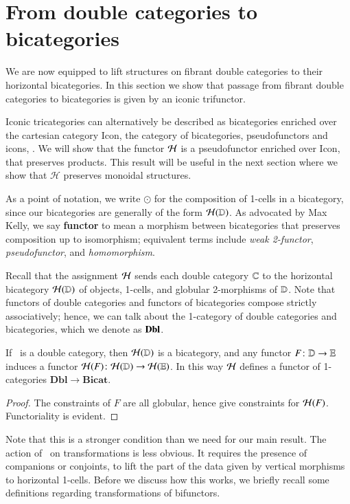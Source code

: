\documentclass{amsart}
\begin{document}
\section{From double categories to bicategories}
\label{sec:1x1-to-bicat}

We are now equipped to lift structures on fibrant double categories to
their horizontal bicategories.  In this section we show that passage
from fibrant double categories to bicategories is given by an iconic trifunctor.

Iconic tricategories can alternatively be described as bicategories enriched over the cartesian category Icon, the category of bicategories, pseudofunctors and icons, \cite{shulman:psalg}.
We will show that the functor $\mathcal{H}$ is a pseudofunctor enriched over Icon, that preserves products. This result will be useful in the next section where we show that $\mathcal{H}$ preserves monoidal structures.

As a point of notation, we write $\odot$ for the composition of
1-cells in a bicategory, since our bicategories are generally of the
form $\mathcal{H}(\mathbb{D})$.  As advocated by Max Kelly, we say \textbf{functor}
to mean a morphism between bicategories that preserves composition up
to isomorphism; equivalent terms include \emph{weak 2-functor},
\emph{pseudofunctor}, and \emph{homomorphism}.


Recall that the assignment $\mathcal{H}$ sends each double category $\mathbb{C}$ to the horizontal bicategory  $\mathcal{H}(\mathbb{D})$ of objects, 1-cells, and globular 2-morphisms of $\mathbb{D}$.  Note that functors of double categories and functors of bicategories compose strictly associatively; hence, we can talk about the 1-category of double categories and bicategories, which we denote as ${\bf Dbl}$.  

\begin{thm}\label{thm:1-func}
 If \lD\ is a double category, then $\mathcal{H}(\mathbb{D})$ is a bicategory, and
  any functor $F\colon \mathbb{D}\to\mathbb{E}$ induces a functor $\mathcal{H}(F)\colon
  \mathcal{H}(\mathbb{D})\to\mathcal{H}(\mathbb{E})$.  In this way $\mathcal{H}$ defines a functor of
  1-categories $\mathbf{Dbl}\to \mathbf{Bicat}$.
\end{thm}
\begin{proof}
 The constraints of $F$ are all globular, hence give constraints for
  $\mathcal{H}(F)$.  Functoriality is evident.
\end{proof}

Note that this is a stronger condition than we need for our main result. The action of \cH\ on transformations is less obvious. It
requires the presence of companions or conjoints, to lift the part of the data given by vertical morphisms to horizontal 1-cells. Before we discuss how this works, we briefly recall some definitions regarding transformations of bifunctors. 
\end{document}
